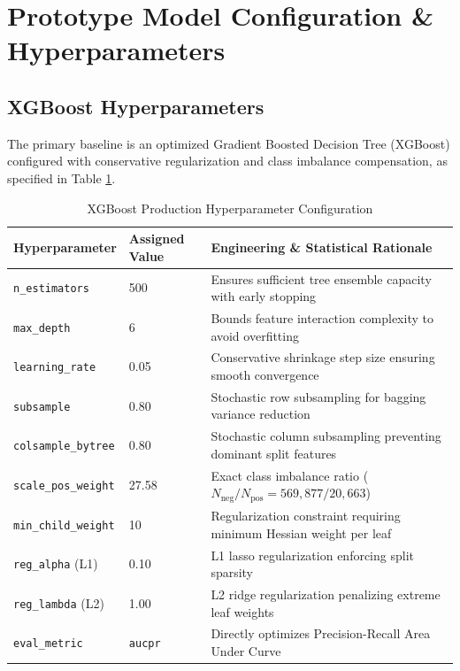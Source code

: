 \documentclass[11pt,a4paper]{report}
\begin{document}
\section{Prototype Model Configuration \& Hyperparameters}

\subsection{XGBoost Hyperparameters}
The primary baseline is an optimized Gradient Boosted Decision Tree (XGBoost) configured with conservative regularization and class imbalance compensation, as specified in Table \ref{tab:xgboost_params}.

\begin{table}[H]
\centering
\caption{XGBoost Production Hyperparameter Configuration}
\label{tab:xgboost_params}
\begin{tabular}{lll}
\toprule
\textbf{Hyperparameter} & \textbf{Assigned Value} & \textbf{Engineering \& Statistical Rationale} \\
\midrule
\texttt{n\_estimators} & 500 & Ensures sufficient tree ensemble capacity with early stopping \\
\texttt{max\_depth} & 6 & Bounds feature interaction complexity to avoid overfitting \\
\texttt{learning\_rate} & 0.05 & Conservative shrinkage step size ensuring smooth convergence \\
\texttt{subsample} & 0.80 & Stochastic row subsampling for bagging variance reduction \\
\texttt{colsample\_bytree} & 0.80 & Stochastic column subsampling preventing dominant split features \\
\texttt{scale\_pos\_weight} & 27.58 & Exact class imbalance ratio ($N_{\text{neg}} / N_{\text{pos}} = 569{,}877 / 20{,}663$) \\
\texttt{min\_child\_weight} & 10 & Regularization constraint requiring minimum Hessian weight per leaf \\
\texttt{reg\_alpha} (L1) & 0.10 & L1 lasso regularization enforcing split sparsity \\
\texttt{reg\_lambda} (L2) & 1.00 & L2 ridge regularization penalizing extreme leaf weights \\
\texttt{eval\_metric} & \texttt{aucpr} & Directly optimizes Precision-Recall Area Under Curve \\
\bottomrule
\end{tabular}
\end{table}
\end{document}
